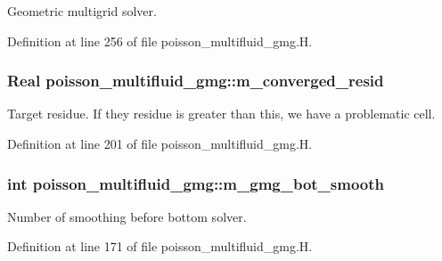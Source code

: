 Geometric multigrid solver. 



Definition at line 256 of file poisson\+\_\+multifluid\+\_\+gmg.\+H.

\subsubsection[{\texorpdfstring{m\+\_\+converged\+\_\+resid}{m_converged_resid}}]{\setlength{\rightskip}{0pt plus 5cm}Real poisson\+\_\+multifluid\+\_\+gmg\+::m\+\_\+converged\+\_\+resid\hspace{0.3cm}{\ttfamily [protected]}}\hypertarget{classpoisson__multifluid__gmg_aa018c7cf22076e64f4a89ba76c8c545c}{}\label{classpoisson__multifluid__gmg_aa018c7cf22076e64f4a89ba76c8c545c}


Target residue. If they residue is greater than this, we have a problematic cell. 



Definition at line 201 of file poisson\+\_\+multifluid\+\_\+gmg.\+H.

\subsubsection[{\texorpdfstring{m\+\_\+gmg\+\_\+bot\+\_\+smooth}{m_gmg_bot_smooth}}]{\setlength{\rightskip}{0pt plus 5cm}int poisson\+\_\+multifluid\+\_\+gmg\+::m\+\_\+gmg\+\_\+bot\+\_\+smooth\hspace{0.3cm}{\ttfamily [protected]}}\hypertarget{classpoisson__multifluid__gmg_abe063a69192d156c3d865eaaf7b1f1dd}{}\label{classpoisson__multifluid__gmg_abe063a69192d156c3d865eaaf7b1f1dd}


Number of smoothing before bottom solver. 



Definition at line 171 of file poisson\+\_\+multifluid\+\_\+gmg.\+H.

